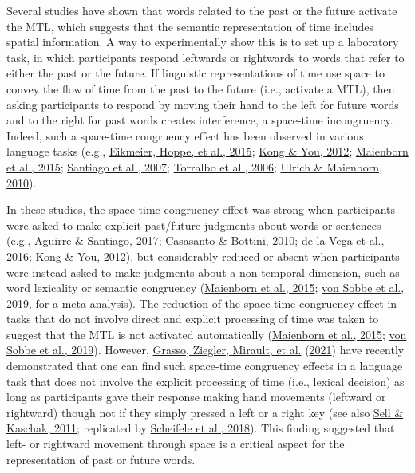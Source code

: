 \documentclass[
  a4paper,12pt,twoside,onecolumn,openright,final,oldfontcommands]{memoir}
\begin{document}
Several studies have shown that words related to the past or the future activate the MTL, which suggests that the semantic representation of time includes spatial information. A way to experimentally show this is to set up a laboratory task, in which participants respond leftwards or rightwards to words that refer to either the past or the future. If linguistic representations of time use space to convey the flow of time from the past to the future (i.e., activate a MTL), then asking participants to respond by moving their hand to the left for future words and to the right for past words creates interference, a space-time incongruency. Indeed, such a space-time congruency effect has been observed in various language tasks (e.g., \protect\hyperlink{ref-eikmeier_response_2015}{Eikmeier, Hoppe, et al., 2015}; \protect\hyperlink{ref-kong_space-time_2012}{Kong \& You, 2012}; \protect\hyperlink{ref-maienborn_we_2015}{Maienborn et al., 2015}; \protect\hyperlink{ref-santiago_time_2007}{Santiago et al., 2007}; \protect\hyperlink{ref-torralbo_flexible_2006}{Torralbo et al., 2006}; \protect\hyperlink{ref-ulrich_leftright_2010}{Ulrich \& Maienborn, 2010}).

In these studies, the space-time congruency effect was strong when participants were asked to make explicit past/future judgments about words or sentences (e.g., \protect\hyperlink{ref-aguirre_potential_2017}{Aguirre \& Santiago, 2017}; \protect\hyperlink{ref-hutchison_can_2010}{Casasanto \& Bottini, 2010}; \protect\hyperlink{ref-de_la_vega_mental_2016}{de la Vega et al., 2016}; \protect\hyperlink{ref-kong_space-time_2012}{Kong \& You, 2012}), but considerably reduced or absent when participants were instead asked to make judgments about a non-temporal dimension, such as word lexicality or semantic congruency (\protect\hyperlink{ref-maienborn_we_2015}{Maienborn et al., 2015}; \protect\hyperlink{ref-von_sobbe_space-time_2019}{von Sobbe et al., 2019}, for a meta-analysis). The reduction of the space-time congruency effect in tasks that do not involve direct and explicit processing of time was taken to suggest that the MTL is not activated automatically (\protect\hyperlink{ref-maienborn_we_2015}{Maienborn et al., 2015}; \protect\hyperlink{ref-von_sobbe_space-time_2019}{von Sobbe et al., 2019}). However, \protect\hyperlink{ref-grasso_as_2021}{Grasso, Ziegler, Mirault, et al.} (\protect\hyperlink{ref-grasso_as_2021}{2021}) have recently demonstrated that one can find such space-time congruency effects in a language task that does not involve the explicit processing of time (i.e., lexical decision) as long as participants gave their response making hand movements (leftward or rightward) though not if they simply pressed a left or a right key (see also \protect\hyperlink{ref-sell_processing_2011}{Sell \& Kaschak, 2011}; replicated by \protect\hyperlink{ref-scheifele_replication_2018}{Scheifele et al., 2018}). This finding suggested that left- or rightward movement through space is a critical aspect for the representation of past or future words.
\end{document}
